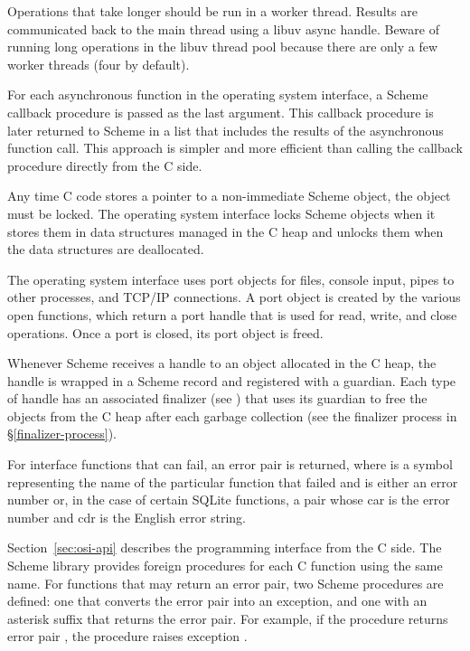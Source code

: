 Operations that take longer should be run in a worker thread. Results
are communicated back to the main thread using a libuv async
handle. Beware of running long operations in the libuv thread pool
because there are only a few worker threads (four by default).

For each asynchronous function in the operating system interface, a
Scheme callback procedure is passed as the last argument.  This
callback procedure is later returned to Scheme in a list that includes
the results of the asynchronous function call. This approach is
simpler and more efficient than calling the callback procedure
directly from the C side.

Any time C code stores a pointer to a non-immediate Scheme object, the
object must be locked. The operating system interface locks Scheme
objects when it stores them in data structures managed in the C heap
and unlocks them when the data structures are deallocated.

The operating system interface uses port objects for files, console
input, pipes to other processes, and TCP/IP connections. A port object
is created by the various open functions, which return a port handle
that is used for read, write, and close operations. Once a port is
closed, its port object is freed.

Whenever Scheme receives a handle to an object allocated in the C
heap, the handle is wrapped in a Scheme record and registered with a
guardian. Each type of handle has an associated finalizer (see
) that uses its guardian to free the objects from
the C heap after each garbage collection (see the finalizer process in
\S\ref{finalizer-process}).

For interface functions that can fail, an error pair
 is returned, where  is a
symbol representing the name of the particular function that failed
and  is either an error number or, in the case of certain
SQLite functions, a pair whose car is the error number and cdr is the
English error string.

Section~\ref{sec:osi-api} describes the programming interface from the
C side. The Scheme library  provides foreign procedures
for each C function using the same name. For functions that may return
an error pair, two Scheme procedures are defined: one that converts
the error pair into an exception, and one with an asterisk suffix that
returns the error pair. For example, if the 
procedure returns error pair , the
 procedure raises exception .

